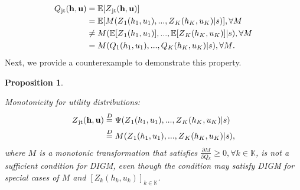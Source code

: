 \documentclass[twoside,11pt]{article}
\newcommand{\state}{s}
\newcommand{\jointaction}{\mathbf{u}}
\newcommand{\action}{u}
\newcommand{\jointobservationhistory}{\mathbf{h}}
\newcommand{\observationhistory}{h}
\newcommand{\agentspace}{\mathbb{K}}
\newcommand{\agentcounter}{k}
\newcommand{\numberofagents}{K}
\newcommand{\utilityexp}{Q}
\newcommand{\utility}{Z}
\newcommand{\joint}{\mathrm{jt}}
\newcommand{\monotonicfunction}{M}
\newcommand{\meandecompositionfunction}{\Psi}
\newcommand{\monotonicity}{\textit{Monotonicity}}
\newcommand{\digm}{DIGM}
\newcommand{\eqd}{\overset{D}{=}}
\newcounter{example0}
\newcounter{theorem0}
\newcounter{proposition0}
\newtheorem{proposition}[proposition0]{Proposition}
\begin{document}
\begin{equation}
\begin{split}
\utilityexp{}_{\joint{}}(\jointobservationhistory{},{\jointaction{}}) &= \mathbb{E}[\utility{}_{\joint{}}(\jointobservationhistory{},{\jointaction{}})] \\
&= \mathbb{E}[\monotonicfunction{}(\utility{}_1(\observationhistory{}_1,\action{}_1), ..., \utility{}_{\numberofagents{}}(\observationhistory{}_{\numberofagents{}},\action{}_{\numberofagents{}})\vert\state)], \forall\monotonicfunction{} \\
&\ne \monotonicfunction{}(\mathbb{E}[\utility{}_1(\observationhistory{}_1,\action{}_1)], ..., \mathbb{E}[\utility{}_{\numberofagents{}}(\observationhistory{}_{\numberofagents{}},\action{}_{\numberofagents{}})]\vert\state), \forall\monotonicfunction{} \\
&= \monotonicfunction{}(\utilityexp{}_1(\observationhistory{}_1,\action{}_1), ..., \utilityexp{}_{\numberofagents{}}(\observationhistory{}_{\numberofagents{}},\action{}_{\numberofagents{}})\vert\state), \forall\monotonicfunction{}.
\end{split}
\notag{}
\end{equation} Next, we provide a counterexample to demonstrate this property.
\begin{proposition}
\label{prop:distributional_monotonicity}

\monotonicity{} for utility distributions:
\begin{equation}
\begin{split}
\utility{}_{\joint{}}(\jointobservationhistory{},{\jointaction{}}) &\eqd \meandecompositionfunction{}(\utility{}_1(\observationhistory{}_1,\action{}_1), ..., \utility{}_\numberofagents(\observationhistory{}_\numberofagents,\action{}_\numberofagents)\vert\state)\\
&\eqd \monotonicfunction{}( \utility{}_1(\observationhistory{}_1,\action{}_1), ..., \utility{}_{\numberofagents{}}(\observationhistory{}_{\numberofagents{}},\action{}_{\numberofagents{}})\vert\state),
\end{split}
\notag{}
\end{equation}
where $\monotonicfunction$ is a monotonic transformation that satisfies $\frac{\partial \monotonicfunction}{\partial \utilityexp{}_\agentcounter{}}\ge 0, \forall \agentcounter{}\in\agentspace{}$, is not a sufficient condition for DIGM, even though the condition may satisfy \digm{} for special cases of $\monotonicfunction{}$ and $[\utility{}_{\agentcounter{}}(\observationhistory{}_{\agentcounter{}},\action{}_{\agentcounter{}})]_{\agentcounter{}\in\agentspace{}}$.

\end{proposition}
\end{document}
